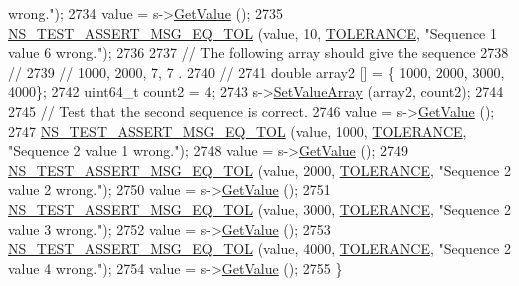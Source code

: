 \begin{DoxyCode}
{       wrong."}); 
2734   value = s->\hyperlink{classns3_1_1DeterministicRandomVariable_aad908286981f00bc2f335c34c41b6f55}{GetValue} (); 
2735   \hyperlink{group__testing_ga9e7861b56b4e70db3b56044cb7a28e41}{NS\_TEST\_ASSERT\_MSG\_EQ\_TOL} (value, 10, \hyperlink{classRandomVariableStreamDeterministicTestCase_aa1cf92085bcc0ffa800f46707b1b29d8}{TOLERANCE}, \textcolor{stringliteral}{"Sequence 1 value 6
       wrong."}); 
2736 
2737   \textcolor{comment}{// The following array should give the sequence}
2738   \textcolor{comment}{//}
2739   \textcolor{comment}{//    1000, 2000, 7, 7 .}
2740   \textcolor{comment}{//}
2741   \textcolor{keywordtype}{double} array2 [] = \{ 1000, 2000, 3000, 4000\};
2742   uint64\_t count2 = 4;
2743   s->\hyperlink{classns3_1_1DeterministicRandomVariable_af705c5489a2cb8dd541b1f460c344804}{SetValueArray} (array2, count2);
2744 
2745   \textcolor{comment}{// Test that the second sequence is correct.}
2746   value = s->\hyperlink{classns3_1_1DeterministicRandomVariable_aad908286981f00bc2f335c34c41b6f55}{GetValue} (); 
2747   \hyperlink{group__testing_ga9e7861b56b4e70db3b56044cb7a28e41}{NS\_TEST\_ASSERT\_MSG\_EQ\_TOL} (value, 1000, \hyperlink{classRandomVariableStreamDeterministicTestCase_aa1cf92085bcc0ffa800f46707b1b29d8}{TOLERANCE}, \textcolor{stringliteral}{"Sequence 2 value 1
       wrong."}); 
2748   value = s->\hyperlink{classns3_1_1DeterministicRandomVariable_aad908286981f00bc2f335c34c41b6f55}{GetValue} (); 
2749   \hyperlink{group__testing_ga9e7861b56b4e70db3b56044cb7a28e41}{NS\_TEST\_ASSERT\_MSG\_EQ\_TOL} (value, 2000, \hyperlink{classRandomVariableStreamDeterministicTestCase_aa1cf92085bcc0ffa800f46707b1b29d8}{TOLERANCE}, \textcolor{stringliteral}{"Sequence 2 value 2
       wrong."}); 
2750   value = s->\hyperlink{classns3_1_1DeterministicRandomVariable_aad908286981f00bc2f335c34c41b6f55}{GetValue} (); 
2751   \hyperlink{group__testing_ga9e7861b56b4e70db3b56044cb7a28e41}{NS\_TEST\_ASSERT\_MSG\_EQ\_TOL} (value, 3000, \hyperlink{classRandomVariableStreamDeterministicTestCase_aa1cf92085bcc0ffa800f46707b1b29d8}{TOLERANCE}, \textcolor{stringliteral}{"Sequence 2 value 3
       wrong."}); 
2752   value = s->\hyperlink{classns3_1_1DeterministicRandomVariable_aad908286981f00bc2f335c34c41b6f55}{GetValue} (); 
2753   \hyperlink{group__testing_ga9e7861b56b4e70db3b56044cb7a28e41}{NS\_TEST\_ASSERT\_MSG\_EQ\_TOL} (value, 4000, \hyperlink{classRandomVariableStreamDeterministicTestCase_aa1cf92085bcc0ffa800f46707b1b29d8}{TOLERANCE}, \textcolor{stringliteral}{"Sequence 2 value 4
       wrong."}); 
2754   value = s->\hyperlink{classns3_1_1DeterministicRandomVariable_aad908286981f00bc2f335c34c41b6f55}{GetValue} (); 
2755 \}
\end{DoxyCode}


